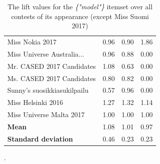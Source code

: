 \documentclass[english]{tktltiki}
\begin{document}
\begin{table}[H]
\begin{adjustbox}{width=1\textwidth}
\begin{tabular}{lccc}
                                   Miss Nokia 2017 &  0.96 &  0.90 &    1.86 \\
                        Miss Universe Australia... &  0.96 &  0.88 &    0.00 \\
                         Mr. CASED 2017 Candidates &  1.08 &  0.63 &    0.00 \\
                         Ms. CASED 2017 Candidates &  0.80 &  0.82 &    0.00 \\
                       Sunny's suosikkiasukilpailu &  0.57 &  0.96 &    0.00 \\
                                Miss Helsinki 2016 &  1.27 &  1.32 &    1.14 \\
                          Miss Universe Malta 2017 &  1.00 &  1.00 &    1.00 \\
        \bottomrule
        \textbf{Mean} & 1.08 & 1.01 & 0.97 \\
        \textbf{Standard deviation} & 0.46 & 0.23 & 0.23
    \end{tabular}
    \end{adjustbox}
    \caption{The lift values for the \emph{\{"model"\}} itemset over all contests of its appearance (except Miss Suomi 2017)}.
    \label{model_itemset_lift_observations}
\end{table}
\end{document}
